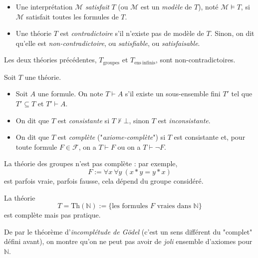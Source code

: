 \documentclass[./main]{subfiles}
\begin{document}
  \begin{defn}[Sémantique]
    \begin{itemize}
      \item Une interprétation $\mathcal{M}$ \textit{satisfait} $T$ (ou $\mathcal{M}$ est un \textit{modèle} de $T$), noté $\mathcal{M} \models T$, si $\mathcal{M}$ satisfait toutes les formules de $T$.
      \item Une théorie $T$ est \textit{contradictoire} s'il n'existe pas de modèle de $T$. Sinon, on dit qu'elle est \textit{non-contradictoire}, ou \textit{satisfiable}, ou \textit{satisfaisable}.
    \end{itemize}
  \end{defn}

  \begin{exm}
    Les deux théories précédentes, $T_\mathrm{groupes}$ et $T_\mathrm{ens\ infinis}$, sont non-contradictoires.
  \end{exm}

  \begin{defn}[Syntaxique]
    Soit $T$ une théorie.
    \begin{itemize}
      \item Soit $A$ une formule. On note $T \vdash A$ s'il existe un sous-ensemble fini $T'$ tel que $T' \subseteq T$ et $T' \vdash A$.
      \item On dit que $T$ est \textit{consistante} si $T \nvdash \bot$, sinon $T$ est \textit{inconsistante}.
      \item On dit que $T$ est \textit{complète} ("\textit{axiome-complète}") si $T$ est consistante et, pour toute formule $F \in \mathcal{F}$, on a $T \vdash F$ ou on a $T \vdash \lnot F$.
    \end{itemize}
  \end{defn}

  \begin{exm}
    La théorie des groupes n'est pas complète : par exemple, \[
    F := \forall x \: \forall y \: (x * y = y * x)
    \] est parfois vraie, parfois fausse, cela dépend du groupe considéré.
  \end{exm}

  \begin{exm}
    La théorie \[
      T = \mathrm{Th}(\mathds{N}) := \{\text{les formules $F$ vraies dans $\mathds{N}$}\}
    \] est complète mais pas pratique.

    De par le théorème d'\textit{incomplétude de Gödel} (c'est un sens différent du "complet" défini avant), on montre qu'on ne peut pas avoir de \textit{joli} ensemble d'axiomes pour $\mathds{N}$.
  \end{exm}
\end{document}
